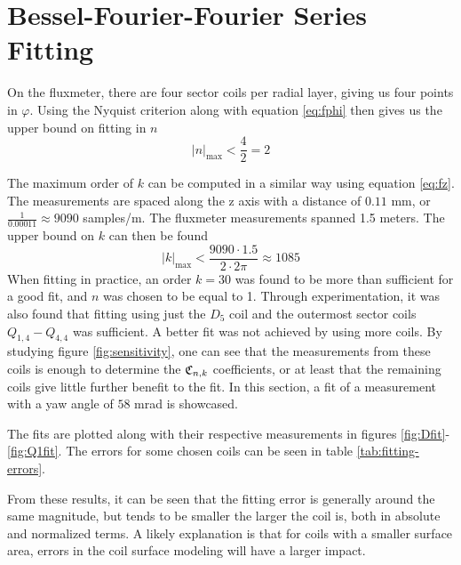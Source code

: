 \section{Bessel-Fourier-Fourier Series Fitting}
\label{sec:BFF-fitting}
On the fluxmeter, there are four
sector coils per radial layer, giving us four points in $\varphi$.
Using the Nyquist criterion along with equation \ref{eq:fphi}
then gives us the upper bound on fitting in $n$
\begin{equation}
    |n|_{\text{max}} < \frac{4}{2} = 2
\end{equation}

The maximum order of $k$ can be computed in a similar way
using equation \ref{eq:fz}.
The measurements are spaced
along the z axis with a distance of $0.11$ mm, or
$\frac{1}{0.00011} \approx 9090$ samples/m. The fluxmeter
measurements spanned 1.5 meters.
The upper bound on $k$ can then be found
\begin{equation}
    |k|_{\text{max}} < \frac{9090\cdot 1.5}{2\cdot 2\pi} \approx 1085
\end{equation}
When fitting in practice, an order $k=30$ was found to be
more than sufficient for a good fit, and $n$ was chosen to
be equal to 1. Through experimentation, it was also found
that fitting using just the $D_5$ coil and the outermost
sector coils $Q_{1,4}-Q_{4,4}$ was sufficient. A better fit
was not achieved by using more coils. By studying figure
\ref{fig:sensitivity}, one can see that the measurements
from these coils is enough to determine the $\mathfrak{C}_{n,k}$
coefficients, or at least that the remaining coils give
little further benefit to the fit. In this section, a
fit of a measurement with a yaw angle of $58$ mrad is
showcased.

The fits are plotted along with their respective measurements
in figures \ref{fig:Dfit}-\ref{fig:Q1fit}. The errors for
some chosen coils can be seen in table \ref{tab:fitting-errors}.

From these results, it can be seen that the
fitting error is generally around the same magnitude, but tends
to be smaller the larger the coil is, both in absolute and
normalized terms. A likely explanation is that for coils
with a smaller surface area, errors in the coil surface
modeling will have a larger impact.

